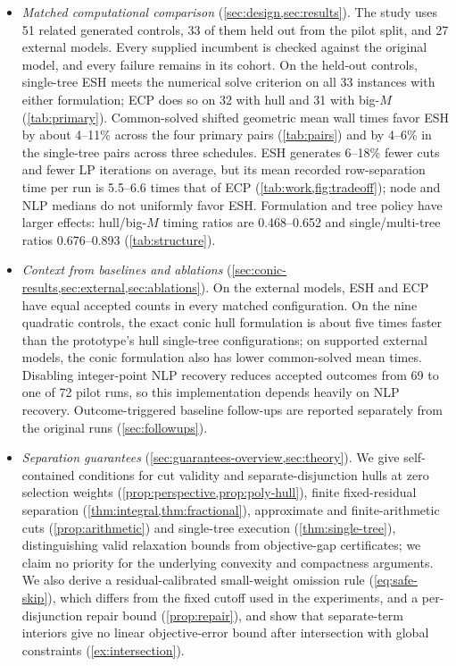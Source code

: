 \begin{itemize}
 \item \emph{Matched computational comparison} (\cref{sec:design,sec:results}). The study uses 51 related generated controls, 33 of them held out from the pilot split, and 27 external models. Every supplied incumbent is checked against the original model, and every failure remains in its cohort. On the held-out controls, single-tree ESH meets the numerical solve criterion on all 33 instances with either formulation; ECP does so on 32 with hull and 31 with big-$M$ (\cref{tab:primary}). Common-solved shifted geometric mean wall times favor ESH by about 4--11\% across the four primary pairs (\cref{tab:pairs}) and by 4--6\% in the single-tree pairs across three schedules. ESH generates 6--18\% fewer cuts and fewer LP iterations on average, but its mean recorded row-separation time per run is 5.5--6.6 times that of ECP (\cref{tab:work,fig:tradeoff}); node and NLP medians do not uniformly favor ESH. Formulation and tree policy have larger effects: hull/big-$M$ timing ratios are 0.468--0.652 and single/multi-tree ratios 0.676--0.893 (\cref{tab:structure}).
 \item \emph{Context from baselines and ablations} (\cref{sec:conic-results,sec:external,sec:ablations}). On the external models, ESH and ECP have equal accepted counts in every matched configuration. On the nine quadratic controls, the exact conic hull formulation is about five times faster than the prototype's hull single-tree configurations; on supported external models, the conic formulation also has lower common-solved mean times. Disabling integer-point NLP recovery reduces accepted outcomes from 69 to one of 72 pilot runs, so this implementation depends heavily on NLP recovery. Outcome-triggered baseline follow-ups are reported separately from the original runs (\cref{sec:followups}).
 \item \emph{Separation guarantees} (\cref{sec:guarantees-overview,sec:theory}). We give self-contained conditions for cut validity and separate-disjunction hulls at zero selection weights (\cref{prop:perspective,prop:poly-hull}), finite fixed-residual separation (\cref{thm:integral,thm:fractional}), approximate and finite-arithmetic cuts (\cref{prop:arithmetic}) and single-tree execution (\cref{thm:single-tree}), distinguishing valid relaxation bounds from objective-gap certificates; we claim no priority for the underlying convexity and compactness arguments. We also derive a residual-calibrated small-weight omission rule (\cref{eq:safe-skip}), which differs from the fixed cutoff used in the experiments, and a per-disjunction repair bound (\cref{prop:repair}), and show that separate-term interiors give no linear objective-error bound after intersection with global constraints (\cref{ex:intersection}).

\end{itemize}
